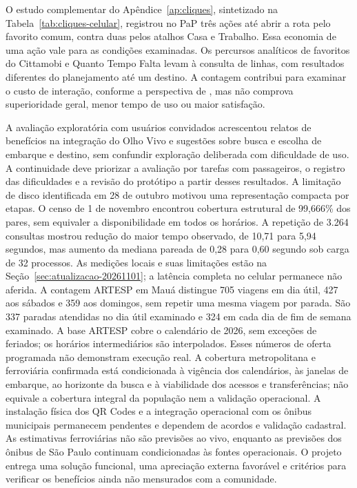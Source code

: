 \documentclass[12pt,oneside,a4paper,brazil,chapter=TITLE]{abntex2}
\begin{document}
O estudo complementar do Apêndice~\ref{ap:cliques}, sintetizado na Tabela~\ref{tab:cliques-celular}, registrou no PaP três ações até abrir a rota pelo favorito comum, contra duas pelos atalhos Casa e Trabalho. Essa economia de uma ação vale para as condições examinadas. Os percursos analíticos de favoritos do Cittamobi e Quanto Tempo Falta levam à consulta de linhas, com resultados diferentes do planejamento até um destino. A contagem contribui para examinar o custo de interação, conforme a perspectiva de \citet{card1980}, mas não comprova superioridade geral, menor tempo de uso ou maior satisfação.

A avaliação exploratória com usuários convidados acrescentou relatos de benefícios na integração do Olho Vivo e sugestões sobre busca e escolha de embarque e destino, sem confundir exploração deliberada com dificuldade de uso. A continuidade deve priorizar a avaliação por tarefas com passageiros, o registro das dificuldades e a revisão do protótipo a partir desses resultados. A limitação de disco identificada em 28 de outubro motivou uma representação compacta por etapas. O censo de 1 de novembro encontrou cobertura estrutural de 99,666\% dos pares, sem equivaler a disponibilidade em todos os horários. A repetição de 3.264 consultas mostrou redução do maior tempo observado, de 10,71 para 5,94 segundos, mas aumento da mediana pareada de 0,28 para 0,60 segundo sob carga de 32 processos. As medições locais e suas limitações estão na Seção~\ref{sec:atualizacao-20261101}; a latência completa no celular permanece não aferida. A contagem ARTESP em Mauá distingue 705 viagens em dia útil, 427 aos sábados e 359 aos domingos, sem repetir uma mesma viagem por parada. São 337 paradas atendidas no dia útil examinado e 324 em cada dia de fim de semana examinado. A base ARTESP cobre o calendário de 2026, sem exceções de feriados; os horários intermediários são interpolados. Esses números de oferta programada não demonstram execução real. A cobertura metropolitana e ferroviária confirmada está condicionada à vigência dos calendários, às janelas de embarque, ao horizonte da busca e à viabilidade dos acessos e transferências; não equivale a cobertura integral da população nem a validação operacional. A instalação física dos QR Codes e a integração operacional com os ônibus municipais permanecem pendentes e dependem de acordos e validação cadastral. As estimativas ferroviárias não são previsões ao vivo, enquanto as previsões dos ônibus de São Paulo continuam condicionadas às fontes operacionais. O projeto entrega uma solução funcional, uma apreciação externa favorável e critérios para verificar os benefícios ainda não mensurados com a comunidade.
\end{document}
